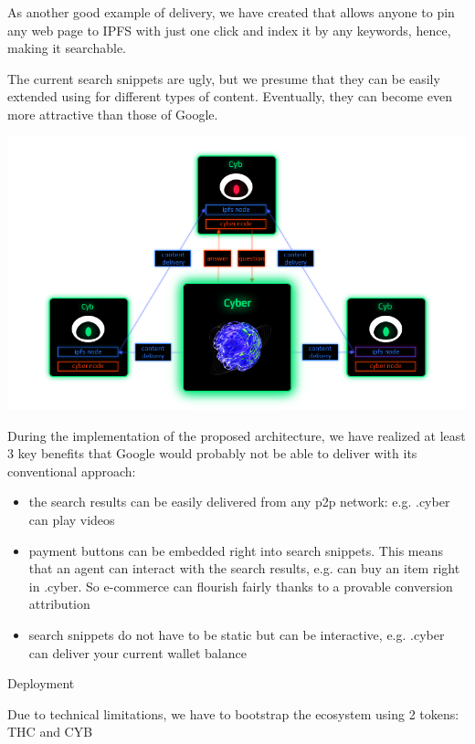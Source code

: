 \documentclass[8pt,oneside]{amsart}
\makeatletter
\newcommand{\linkred}[2]{\href{#1}{\color{red}{#2}}}
\renewcommand\subsection{\@startsection{subsection}
                                    {2}{\z@}
                                    {-3.25ex\@plus -1ex \@minus -.2ex}
                                    {0ex \@plus .2ex}
                                    {\play\Large}
                        }
\newcommand{\titleSection}[1]{\subsection{#1}}
\newenvironment{Figure}
  {\par\medskip\noindent\minipage{\linewidth}}
  {\endminipage\par\medskip}
\makeatother
\begin{document}
As another good example of delivery, we have created \linkred{https://github.com/cybercongress/cyb-virus}{a Chrome extension} that allows anyone to pin any web page to IPFS with just one click and index it by any keywords, hence, making it searchable.

The current search snippets are ugly, but we presume that they can be easily extended using \linkred{https://github.com/ipld/specs}{IPLD} for different types of content. Eventually, they can become even more attractive than those of Google.

\begin{Figure}
    \centering
    \includegraphics[width=1\textwidth]{architecture.png}
\end{Figure}

During the implementation of the proposed architecture, we have realized at least 3 key benefits that Google would probably not be able to deliver with its conventional approach:

\begin{itemize}
\item the search results can be easily delivered from any p2p network: e.g. .cyber can play videos
\item payment buttons can be embedded right into search snippets. This means that an agent can interact with the search results, e.g. can buy an item right in .cyber. So e-commerce can flourish fairly thanks to a provable conversion attribution
\item search snippets do not have to be static but can be interactive, e.g. .cyber can deliver your current wallet balance
\end{itemize}

\titleSection{Deployment}\label{deployment}

Due to technical limitations, we have to bootstrap the ecosystem using 2 tokens: THC and CYB
\end{document}
